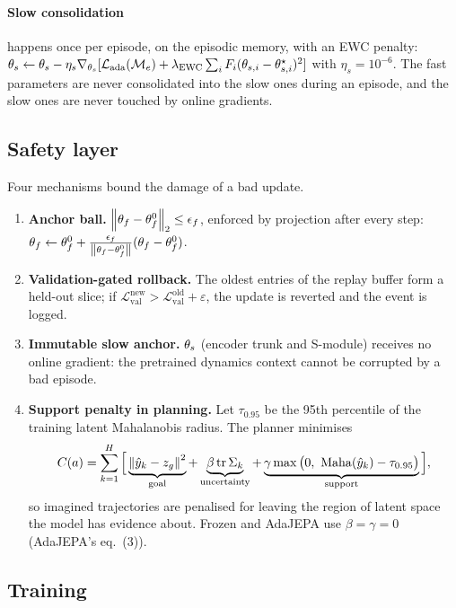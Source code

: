 \paragraph{Slow consolidation} happens once per episode, on the episodic memory, with an EWC
penalty: $\theta_s \leftarrow \theta_s - \eta_s\nabla_{\theta_s}[\mathcal L_{\mathrm{ada}}(\mathcal M_e) +
\lambda_{\mathrm{EWC}}\sum_i F_i(\theta_{s,i}-\theta_{s,i}^\star)^2]$ with $\eta_s = 10^{-6}$. The fast
parameters are never consolidated into the slow ones during an episode, and the slow ones are
never touched by online gradients.

\subsection{Safety layer}\label{sec:safe}

Four mechanisms bound the damage of a bad update.

\begin{enumerate}[leftmargin=1.2em,itemsep=2pt]
\item \textbf{Anchor ball.} $\left\lVert \theta_f-\theta_f^0 \right\rVert_2\le\epsilon_f$, enforced by projection after every
step: $\theta_f \leftarrow \theta_f^0 + \frac{\epsilon_f}{\left\lVert \theta_f-\theta_f^0 \right\rVert}(\theta_f-\theta_f^0)$.
\item \textbf{Validation-gated rollback.} The oldest entries of the replay buffer form a
held-out slice; if $\mathcal L_{\mathrm{val}}^{\mathrm{new}} >
\mathcal L_{\mathrm{val}}^{\mathrm{old}}+\varepsilon$, the update is reverted and the event is
logged.
\item \textbf{Immutable slow anchor.} $\theta_s$ (encoder trunk and S-module) receives no online
gradient: the pretrained dynamics context cannot be corrupted by a bad episode.
\item \textbf{Support penalty in planning.} Let $\tau_{0.95}$ be the 95th percentile of the
training latent Mahalanobis radius. The planner minimises
\begin{equation}
C(a)=\sum_{k=1}^{H}\Big[\underbrace{\norm{\yhat_k-z_g}^2}_{\text{goal}}
+\underbrace{\beta\,\mathrm{tr}\,\Sigma_k}_{\text{uncertainty}}
+\underbrace{\gamma\max\big(0,\ \mathrm{Maha}(\yhat_k)-\tau_{0.95}\big)}_{\text{support}}\Big],
\label{eq:cost}
\end{equation}
so imagined trajectories are penalised for leaving the region of latent space the model has
evidence about. Frozen and AdaJEPA use $\beta=\gamma=0$ (AdaJEPA's eq.~(3)).
\end{enumerate}

\subsection{Training}\label{sec:train}

